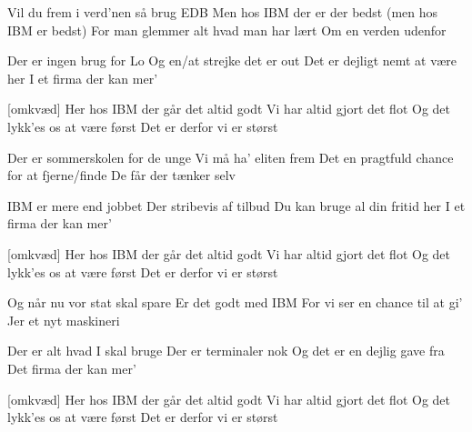 \documentclass[a4paper,11pt]{article}
\begin{document}
\begin{song}

 Vil du frem i verd'nen så brug EDB
  Men hos IBM der er der bedst (men hos IBM er bedst)
  For man glemmer alt hvad man har lært
  Om en verden udenfor

 Der er ingen brug for Lo
  Og en/at strejke det er out
  Det er dejligt nemt at være her
  I et firma der kan mer'

[omkvæd] Her hos IBM der går det altid godt
  Vi har altid gjort det flot
  Og det lykk'es os at være først
  Det er derfor vi er størst

 Der er sommerskolen for de unge
  Vi må ha' eliten frem
  Det en pragtfuld chance for at fjerne/finde
  De får der tænker selv

 IBM er mere end jobbet
  Der stribevis af tilbud
  Du kan bruge al din fritid her
  I et firma der kan mer'

[omkvæd] Her hos IBM der går det altid godt
  Vi har altid gjort det flot
  Og det lykk'es os at være først
  Det er derfor vi er størst

 Og når nu vor stat skal spare
  Er det godt med IBM
  For vi ser en chance til at gi'
  Jer et nyt maskineri

 Der er alt hvad I skal bruge
  Der er terminaler nok
  Og det er en dejlig gave fra
  Det firma der kan mer'

[omkvæd] Her hos IBM der går det altid godt
  Vi har altid gjort det flot
  Og det lykk'es os at være først
  Det er derfor vi er størst

\end{song}
\end{document}

